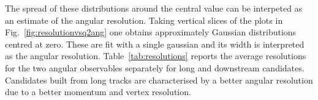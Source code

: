 %
%
The spread of these distributions around the central value can be interpeted as an estimate of the angular resolution.
Taking vertical slices of the plots in Fig.~\ref{fig:resolutionvsq2ang} one obtains approximately Gaussian
distributions centred at zero. These are fit with a single gaussian and its width
is interpreted as the angular resolution. Table~\ref{tab:resolutions} reports the average resolutions
for the two angular observables separately for long and downstream candidates. Candidates built
from long tracks are characterised by a better angular resolution due to a better momentum and vertex resolution.
%
%


